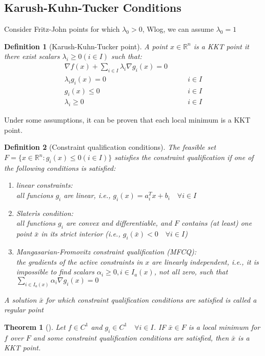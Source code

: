 \documentclass{book}
\newcommand{\R}{\mathbb{R}}
\theoremstyle{theoremv2}
\newtheorem{theorem}{Theorem}[chapter]
\theoremstyle{defv2}
\newtheorem{definition}{Definition}[chapter]
\theoremstyle{remark}
\theoremstyle{remark}
\begin{document}
\subsection{Karush-Kuhn-Tucker Conditions}
Consider Fritz-John points for which $\lambda_0>0$, Wlog, we can assume $\lambda_0=1$ 
\begin{definition}[Karush-Kuhn-Tucker point]
    A point $x\in\R^n$ is a KKT point it there exist scalars $\lambda_i\geq 0 (i\in I)$ such that:
    \begin{align}
        \nabla f(x) + \displaystyle\sum_{i\in I} \lambda_i \nabla g_i(x)=0&\\
        \lambda_i g_i(x)=0& \qquad i\in I\\
        g_i(x)\leq 0 & \qquad i \in I\\
        \lambda_i \geq 0 & \qquad i\in I
    \end{align}
\end{definition}
Under some assumptions, it can be proven that each local minimum is a KKT point. 
\begin{definition}[Constraint qualification conditions]
    The feasible set $F=\{ x\in \R^n:g_i(x)\leq 0 (i\in I) \}$ satisfies the constraint qualification if one of the following conditions is satisfied:
    \begin{enumerate}
        \item linear constraints: \\
            all funcions $g_i$ are linear, i.e., $g_i(x)=a^T_ix+b_i \quad \forall i\in I$
        \item Slaterìs condition: \\
            all functions $g_i$ are convex and differentiable, and $F$ contains (at least) one point $\bar{x}$ in its strict interior (i.e., $g_i(\bar{x})<0 \quad \forall i \in I$)
        \item Mangasarian-Fromovitz constraint qualification (MFCQ):\\
            the gradients of the active constraints in $x$ are linearly independent, i.e., it is impossible to find scalars $\alpha_i\geq 0, i\in I_a(x)$, not all zero, such that $\sum_{i\in I_a(x)}\alpha_i\nabla g_i(x)=0$
    \end{enumerate}
    A solution $\bar{x}$ for which constraint qualification conditions are satisfied is called a \emph{regular point}
\end{definition}
\begin{theorem}[]
    Let $f\in C^1$ and $g_i\in C^1 \quad \forall i \in I$. IF $\bar{x}\in F$ is a local minimum for $f$ over $F$ and some constraint qualification conditions are satisfied, then $\bar{x}$ is a KKT point.
\end{theorem}
\end{document}
